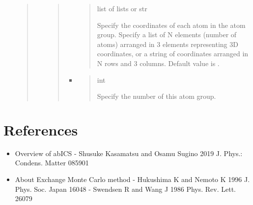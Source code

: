 \documentclass[letterpaper,10pt,english]{sphinxmanual}
\begin{document}
\begin{itemize}
\begin{quote}
\begin{itemize}
\begin{quote}
\begin{itemize}
\begin{quote}
 list of lists or str

  Specify the coordinates of each atom in the atom group.
Specify a list of N elements (number of atoms) arranged in 3 elements representing 3D coordinates, or a string of coordinates arranged in N rows and 3 columns.
Default value is  \sphinxtitleref{{[}{[}0.0, 0.0, 0.0{]}{]}}.
\end{quote}

\item {} 
\begin{quote}

 int

Specify the number of this atom group.
\end{quote}

\end{itemize}
\end{quote}

\end{itemize}
\end{quote}

\end{itemize}


\chapter{References}
\label{\detokenize{algorithm/index:references}}\label{\detokenize{algorithm/index::doc}}\begin{itemize}
\item {} 
Overview of abICS
- Shusuke Kasamatsu and Osamu Sugino 2019 J. Phys.: Condens. Matter  085901

\item {} 
About Exchange Monte Carlo method
- Hukushima K and Nemoto K 1996 J. Phys. Soc. Japan  1604\textendash{}8
- Swendsen R and Wang J 1986 Phys. Rev. Lett.  2607\textendash{}9

\end{itemize}
\end{document}
